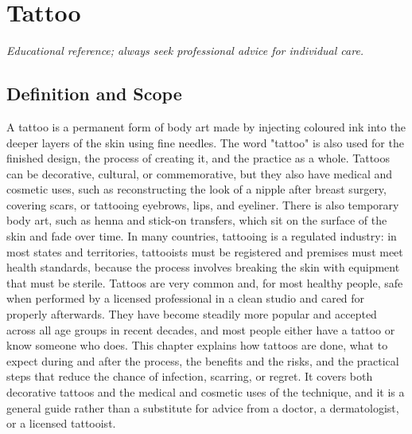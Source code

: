 \chapter{Tattoo}

\medskip
\noindent\textit{Educational reference; always seek professional advice for individual care.}

\section*{Definition and Scope}
A tattoo is a permanent form of body art made by injecting coloured ink into the deeper layers of the skin using fine needles. The word "tattoo" is also used for the finished design, the process of creating it, and the practice as a whole. Tattoos can be decorative, cultural, or commemorative, but they also have medical and cosmetic uses, such as reconstructing the look of a nipple after breast surgery, covering scars, or tattooing eyebrows, lips, and eyeliner. There is also temporary body art, such as henna and stick-on transfers, which sit on the surface of the skin and fade over time. In many countries, tattooing is a regulated industry: in most states and territories, tattooists must be registered and premises must meet health standards, because the process involves breaking the skin with equipment that must be sterile. Tattoos are very common and, for most healthy people, safe when performed by a licensed professional in a clean studio and cared for properly afterwards. They have become steadily more popular and accepted across all age groups in recent decades, and most people either have a tattoo or know someone who does. This chapter explains how tattoos are done, what to expect during and after the process, the benefits and the risks, and the practical steps that reduce the chance of infection, scarring, or regret. It covers both decorative tattoos and the medical and cosmetic uses of the technique, and it is a general guide rather than a substitute for advice from a doctor, a dermatologist, or a licensed tattooist.

